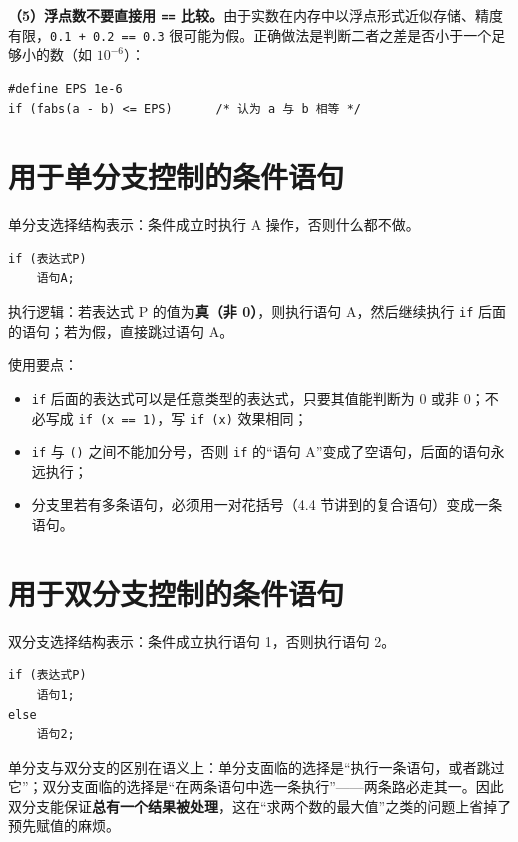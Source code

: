 \textbf{（5）浮点数不要直接用 \texttt{==} 比较。}由于实数在内存中以浮点形式近似存储、精度有限，\texttt{0.1 + 0.2 == 0.3} 很可能为假。正确做法是判断二者之差是否小于一个足够小的数（如 $10^{-6}$）：

\begin{lstlisting}
#define EPS 1e-6
if (fabs(a - b) <= EPS)      /* 认为 a 与 b 相等 */
\end{lstlisting}


\section{用于单分支控制的条件语句}

单分支选择结构表示：条件成立时执行 A 操作，否则什么都不做。

\begin{lstlisting}
if (表达式P)
    语句A;
\end{lstlisting}

执行逻辑：若表达式 P 的值为\textbf{真（非 0）}，则执行语句 A，然后继续执行 \texttt{if} 后面的语句；若为假，直接跳过语句 A。

使用要点：

\begin{itemize}
  \item \texttt{if} 后面的表达式可以是任意类型的表达式，只要其值能判断为 0 或非 0；不必写成 \texttt{if (x == 1)}，写 \texttt{if (x)} 效果相同；
  \item \texttt{if} 与 \texttt{()} 之间不能加分号，否则 \texttt{if} 的“语句 A”变成了空语句，后面的语句永远执行；
  \item 分支里若有多条语句，必须用一对花括号（4.4 节讲到的复合语句）变成一条语句。
\end{itemize}

\section{用于双分支控制的条件语句}

双分支选择结构表示：条件成立执行语句 1，否则执行语句 2。

\begin{lstlisting}
if (表达式P)
    语句1;
else
    语句2;
\end{lstlisting}

单分支与双分支的区别在语义上：单分支面临的选择是“执行一条语句，或者跳过它”；双分支面临的选择是“在两条语句中选一条执行”——两条路必走其一。因此双分支能保证\textbf{总有一个结果被处理}，这在“求两个数的最大值”之类的问题上省掉了预先赋值的麻烦。

